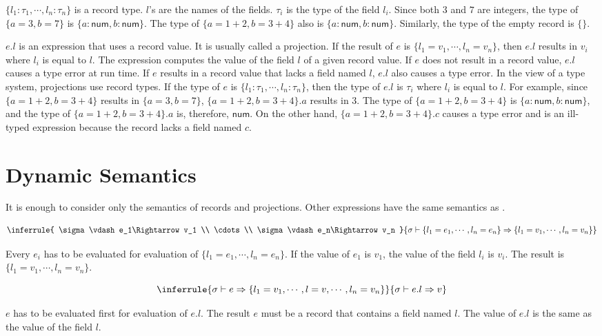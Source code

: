 $\{l_1:\tau_1,\cdots,l_n:\tau_n\}$ is a record type. $l$'s are the names of
the fields. $\tau_i$ is the type of the field $l_i$. Since both $3$ and
$7$ are integers, the type of $\{a=3,b=7\}$ is \(\{a:\textsf{num},b:\textsf{
num}\}\). The type of $\{a=1+2,b=3+4\}$ also is \(\{a:\textsf{num},b:\textsf{
num}\}\). Similarly, the type of the empty record is $\{\}$.

$e.l$ is an expression that uses a record value. It is usually called a
projection. If the result of $e$ is $\{l_1=v_1,\cdots,l_n=v_n\}$, then
$e.l$ results in $v_i$ where $l_i$ is equal to $l$. The expression
computes the value of the field $l$ of a given record value. If $e$ does not
result in a record value, $e.l$ causes a type error at run time. If $e$
results in a record value that lacks a field named $l$, $e.l$ also causes a
type error. In the view of a type system, projections use record types. If the
type of $e$ is $\{l_1:\tau_1,\cdots,l_n:\tau_n\}$, then the type of $e.l$
is $\tau_i$ where $l_i$ is equal to $l$. For example, since
$\{a=1+2,b=3+4\}$ results in $\{a=3,b=7\}$, $\{a=1+2,b=3+4\}.a$ results in
$3$. The type of $\{a=1+2,b=3+4\}$ is $\{a:\textsf{num},b:\textsf{num}\}$, and
the type of $\{a=1+2,b=3+4\}.a$ is, therefore, $\textsf{num}$. On the other hand,
$\{a=1+2,b=3+4\}.c$ causes a type error and is an ill-typed expression because
the record lacks a field named $c$.

\section{Dynamic Semantics}

It is enough to consider only the semantics of records and projections. Other
expressions have the same semantics as \lang.

\[
\inferrule
{ \sigma\vdash e_1\Rightarrow v_1 \\ \cdots \\ \sigma\vdash e_n\Rightarrow v_n }
{ \sigma\vdash \{l_1=e_1,\cdots,l_n=e_n\}\Rightarrow\{l_1=v_1,\cdots,l_n=v_n\} }
\]

Every $e_i$ has to be evaluated for evaluation of
$\{l_1=e_1,\cdots,l_n=e_n\}$. If the value of $e_1$ is $v_1$, the value of
the field $l_i$ is $v_i$. The result is $\{l_1=v_1,\cdots,l_n=v_n\}$.

\[
\inferrule
{ \sigma\vdash e\Rightarrow\{l_1=v_1,\cdots,l=v,\cdots,l_n=v_n\} }
{ \sigma\vdash e.l\Rightarrow v }
\]

$e$ has to be evaluated first for evaluation of $e.l$. The result $e$ must
be a record that contains a field named $l$. The value of $e.l$ is the same
as the value of the field $l$.

